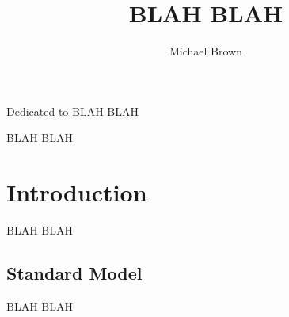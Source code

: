 \documentclass[final]{ukthesis}
\begin{document}

\author{Michael Brown}

\title{BLAH BLAH}


\frontmatter
\maketitle

\begin{dedication}
Dedicated to BLAH BLAH
\end{dedication}

\begin{acknowledgments}
BLAH BLAH
\end{acknowledgments}


\tableofcontents\clearpage
\listoffigures\clearpage
\listoftables\clearpage
\mainmatter
\DoubleSpacing
\chapter{Introduction}
\label{ch:Introduction}

BLAH BLAH


\section{Standard Model}
\label{sec:Standard_Model}

BLAH BLAH

\end{document}
